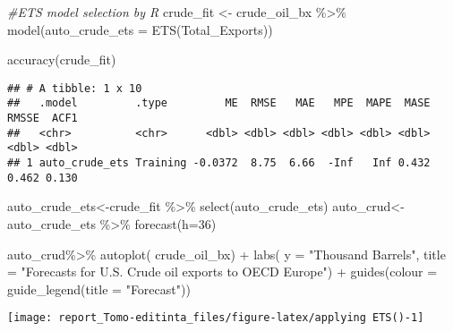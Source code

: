 \documentclass[
]{article}
\newenvironment{Shaded}{\begin{snugshade}}{\end{snugshade}}
\newcommand{\AttributeTok}[1]{\textcolor[rgb]{0.77,0.63,0.00}{#1}}
\newcommand{\CommentTok}[1]{\textcolor[rgb]{0.56,0.35,0.01}{\textit{#1}}}
\newcommand{\DecValTok}[1]{\textcolor[rgb]{0.00,0.00,0.81}{#1}}
\newcommand{\FunctionTok}[1]{\textcolor[rgb]{0.00,0.00,0.00}{#1}}
\newcommand{\NormalTok}[1]{#1}
\newcommand{\OtherTok}[1]{\textcolor[rgb]{0.56,0.35,0.01}{#1}}
\newcommand{\SpecialCharTok}[1]{\textcolor[rgb]{0.00,0.00,0.00}{#1}}
\newcommand{\StringTok}[1]{\textcolor[rgb]{0.31,0.60,0.02}{#1}}
\begin{document}
\begin{Shaded}
\begin{Highlighting}[]
\CommentTok{\#ETS model selection by R}
\NormalTok{crude\_fit }\OtherTok{\textless{}{-}}\NormalTok{ crude\_oil\_bx }\SpecialCharTok{\%\textgreater{}\%}
  \FunctionTok{model}\NormalTok{(}\AttributeTok{auto\_crude\_ets =} \FunctionTok{ETS}\NormalTok{(Total\_Exports))}

\FunctionTok{accuracy}\NormalTok{(crude\_fit)}
\end{Highlighting}
\end{Shaded}

\begin{verbatim}
## # A tibble: 1 x 10
##   .model         .type         ME  RMSE   MAE   MPE  MAPE  MASE RMSSE  ACF1
##   <chr>          <chr>      <dbl> <dbl> <dbl> <dbl> <dbl> <dbl> <dbl> <dbl>
## 1 auto_crude_ets Training -0.0372  8.75  6.66  -Inf   Inf 0.432 0.462 0.130
\end{verbatim}

\begin{Shaded}
\begin{Highlighting}[]
\NormalTok{auto\_crude\_ets}\OtherTok{\textless{}{-}}\NormalTok{crude\_fit }\SpecialCharTok{\%\textgreater{}\%} \FunctionTok{select}\NormalTok{(auto\_crude\_ets)}
\NormalTok{auto\_crud}\OtherTok{\textless{}{-}}\NormalTok{auto\_crude\_ets }\SpecialCharTok{\%\textgreater{}\%} \FunctionTok{forecast}\NormalTok{(}\AttributeTok{h=}\DecValTok{36}\NormalTok{)}

\NormalTok{auto\_crud}\SpecialCharTok{\%\textgreater{}\%} 
  \FunctionTok{autoplot}\NormalTok{(}
\NormalTok{    crude\_oil\_bx) }\SpecialCharTok{+}
  \FunctionTok{labs}\NormalTok{(}
    \AttributeTok{y =} \StringTok{"Thousand Barrels"}\NormalTok{,}
    \AttributeTok{title =} \StringTok{"Forecasts for U.S. Crude oil exports to OECD Europe"}\NormalTok{) }\SpecialCharTok{+}
  \FunctionTok{guides}\NormalTok{(}\AttributeTok{colour =} \FunctionTok{guide\_legend}\NormalTok{(}\AttributeTok{title =} \StringTok{"Forecast"}\NormalTok{))}
\end{Highlighting}
\end{Shaded}

\begin{center}\texttt{[image: report\_Tomo-editinta\_files/figure-latex/applying ETS()-1]} \end{center}
\end{document}
